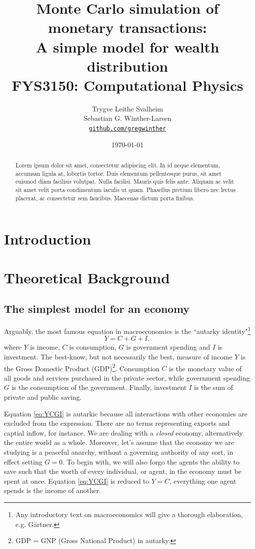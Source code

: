 \documentclass[10pt, a4paper]{amsart}
\title[Simulation of monetary transactions]{Monte Carlo simulation of monetary transactions: \\
\normalsize{A simple model for wealth distribution} \\
  \hrulefill\small{ FYS3150: Computational Physics }\hrulefill}
\author[Svalheim \& Winther-Larsen]{Trygve Leithe Svalheim \\
   Sebastian G. Winther-Larsen \\
  \href{https://github.com/gregwinther/FYS3150/}{\texttt{github.com/gregwinther}}}
\date{\today}
\begin{document}
\begin{titlepage}
\begin{abstract}
Lorem ipsum dolor sit amet, consectetur adipiscing elit. In id neque elementum, accumsan ligula at, lobortis tortor. Duis elementum pellentesque purus, sit amet euismod diam facilisis volutpat. Nulla facilisi. Mauris quis felis ante. Aliquam ac velit sit amet velit porta condimentum iaculis ut quam. Phasellus pretium libero nec lectus placerat, ac consectetur sem faucibus. Maecenas dictum porta finibus.
\end{abstract}
\maketitle
\tableofcontents
\end{titlepage}

\section{Introduction}


\section{Theoretical Background}
\subsection{The simplest model for an economy}
Arguably, the most famous equation in macroeconomics is the ``autarky identity"\footnote{Any introductory text on macroeconomics will give a thorough elaboration, e.g. Gärtner.}
\begin{equation}
\label{eq:YCGI}
Y = C + G + I,
\end{equation}
where $Y$ is income, $C$ is consumption, $G$ is government spending and $I$ is investment. The best-know, but not necessarily the best, measure of income $Y$ is the Gross Domestic Product (GDP)\footnote{GDP = GNP (Gross National Product) in autarky.}. Consumption $C$ is the monetary value of all goods and services purchased in the private sector, while government spending $G$ is the consumption of the government. Finally, investment $I$ is the sum of private and public saving. 

Equation \ref{eq:YCGI} is autarkic because all interactions with other economies are excluded from the expression. There are no terms representing exports and captial inflow, for instance. We are dealing with a \emph{closed} economy, alternatively the entire world as a whole. Moreover, let's assume that the economy we are studying is a peaceful anarchy, without a governing authority of any sort, in effect setting $G = 0$. To begin with, we will also forgo the agents the ability to save such that the worth of every individual, or agent, in the economy must be spent at once. Equation \ref{eq:YCGI} is reduced to $Y = C$, everything one agent spends is the income of another.
\end{document}
